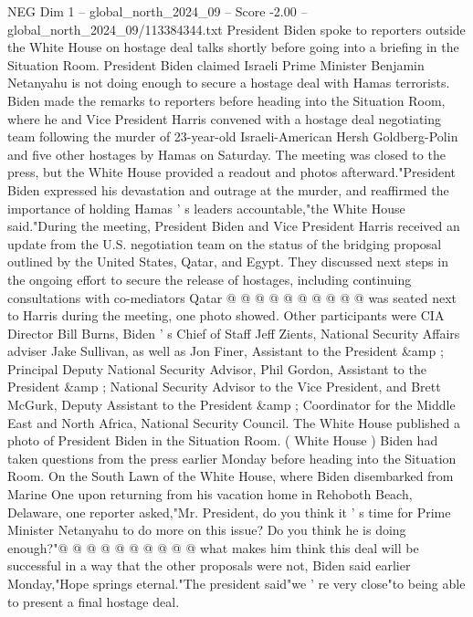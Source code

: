 \begin{textsample}{NEG Dim 1 – global\_north\_2024\_09 – Score -2.00 – global\_north\_2024\_09/113384344.txt}  \label{ex:f1_neg_019}
President Biden spoke to reporters outside the White House on hostage deal talks shortly before going into a briefing in the Situation Room.
President Biden claimed Israeli Prime Minister Benjamin Netanyahu is not doing enough to secure a hostage deal with Hamas terrorists.
Biden made the remarks to reporters before heading into the Situation Room, where he and Vice President Harris convened with a hostage deal negotiating team following the murder of 23-year-old Israeli-American Hersh Goldberg-Polin and five other hostages by Hamas on Saturday.
The meeting was closed to the press, but the White House provided a readout and photos afterward."President Biden expressed his devastation and outrage at the murder, and reaffirmed the importance of holding Hamas ' s leaders accountable,"the White House said."During the meeting, President Biden and Vice President Harris received an update from the U.S. negotiation team on the status of the bridging proposal outlined by the United States, Qatar, and Egypt.
They discussed next steps in the ongoing effort to secure the release of hostages, including continuing consultations with co-mediators Qatar @ @ @ @ @ @ @ @ @ @ was seated next to Harris during the meeting, one photo showed.
Other participants were CIA Director Bill Burns, Biden ' s Chief of Staff Jeff Zients, National Security Affairs adviser Jake Sullivan, as well as Jon Finer, Assistant to the President \&amp ; Principal Deputy National Security Advisor, Phil Gordon, Assistant to the President \&amp ; National Security Advisor to the Vice President, and Brett McGurk, Deputy Assistant to the President \&amp ; Coordinator for the Middle East and North Africa, National Security Council.
The White House published a photo of President Biden in the Situation Room. ( White House ) Biden had taken questions from the press earlier Monday before heading into the Situation Room.
On the South Lawn of the White House, where Biden disembarked from Marine One upon returning from his vacation home in Rehoboth Beach, Delaware, one reporter asked,"Mr.
President, do you think it ' s time for Prime Minister Netanyahu to do more on this issue?
Do you think he is doing enough?"@ @ @ @ @ @ @ @ @ @ what makes him think this deal will be successful in a way that the other proposals were not, Biden said earlier Monday,"Hope springs eternal."The president said"we ' re very close"to being able to present a final hostage deal.

\end{textsample}
